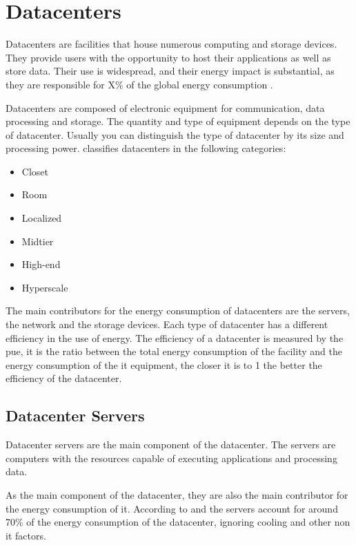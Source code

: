 \section{Datacenters}

Datacenters are facilities that house numerous computing and storage devices. They provide users with the opportunity to host their applications as well as store data. Their use is widespread, and their energy impact is substantial, as they are responsible for X\% of the global energy consumption \cite{get source}.

Datacenters are composed of electronic equipment for communication, data processing and storage. The quantity and type of equipment depends on the type of datacenter. Usually you can distinguish the type of datacenter by its size and processing power. \citet{US-report2016} classifies datacenters in the following categories:

\begin{itemize}
    \item Closet
    \item Room
    \item Localized
    \item Midtier
    \item High-end
    \item Hyperscale
\end{itemize}

The main contributors for the energy consumption of datacenters are the servers, the network and the storage devices. Each type of datacenter has a different efficiency in the use of energy. The efficiency of a datacenter is measured by the \ac{pue}, it is the ratio between the total energy consumption of the facility and the energy consumption of the \ac{it} equipment, the closer it is to 1 the better the efficiency of the datacenter.

\subsection{Datacenter Servers}

Datacenter servers are the main component of the datacenter. The servers are computers with the resources capable of executing applications and processing data.

As the main component of the datacenter, they are also the main contributor for the energy consumption of it. According to \citet{Cheung} and \citet{Miyuru} the servers account for around 70\% of the energy consumption of the datacenter, ignoring cooling and other non \ac{it} factors.


